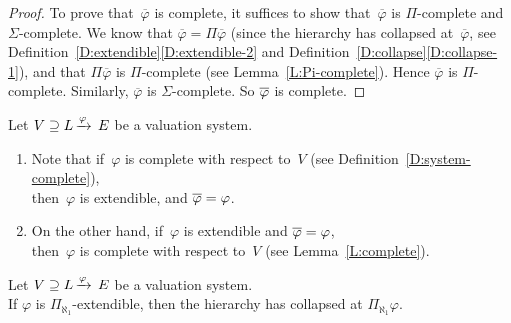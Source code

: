 \documentclass[main.tex]{subfiles}
\begin{document}
\begin{proof}
To prove that~$\overline\varphi$ is complete,
it suffices to show that~$\overline\varphi$
is $\Pi$-complete and $\Sigma$-complete.
We know that $\overline\varphi = \Pi\overline\varphi$
(since the hierarchy has collapsed at~$\overline\varphi$,
see Definition~\ref{D:extendible}\ref{D:extendible-2}
and Definition~\ref{D:collapse}\ref{D:collapse-1}),
and that $\Pi\overline\varphi$ is $\Pi$-complete
(see Lemma~\ref{L:Pi-complete}).
Hence $\overline\varphi$ is $\Pi$-complete.
Similarly,
$\overline\varphi$ is $\Sigma$-complete.
So $\overline\varphi$ is complete.
\end{proof}
%
%
\begin{rem}
\label{R:extendible-complete}
Let $V \supseteq L\,\smash{\xrightarrow{\varphi}\,E}$ be a valuation system.
\begin{enumerate}
\item
Note that if~$\varphi$ is complete with respect to~$V$
(see Definition~\ref{D:system-complete}),\\
then~$\varphi$ is extendible, and $\overline\varphi=\varphi$.
\item
On the other hand,
if~$\varphi$ is extendible and $\overline\varphi=\varphi$,\\
then~$\varphi$ is complete
with respect to~$V$
(see Lemma~\ref{L:complete}).
\end{enumerate}
\end{rem}
%
%
\begin{lem}
\label{L:aleph1}
Let $V \supseteq L\,\smash{\xrightarrow{\varphi}\,E}$ be a valuation system.\\
If $\varphi$ is $\Pi_{\aleph_1}$-extendible,
then the hierarchy has collapsed at $\Pi_{\aleph_1}\varphi$.
\end{lem}
\end{document}
